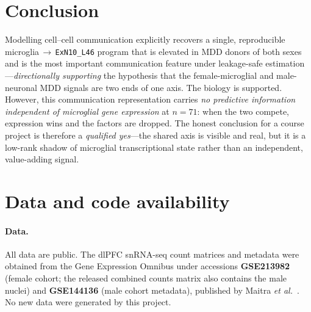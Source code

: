 \documentclass[11pt]{article}
\newcommand{\code}[1]{\texttt{\small #1}}
\begin{document}
\section{Conclusion}

Modelling cell--cell communication explicitly recovers a single, reproducible
microglia\,$\rightarrow$\,\code{ExN10\_L46} program that is elevated in MDD
donors of both sexes and is the most important communication feature under
leakage-safe estimation---\emph{directionally supporting} the hypothesis that the
female-microglial and male-neuronal MDD signals are two ends of one axis. The
biology is supported. However, this communication representation carries
\emph{no predictive information independent of microglial gene expression} at
$n=71$: when the two compete, expression wins and the factors are dropped. The
honest conclusion for a course project is therefore a \emph{qualified yes}---the
shared axis is visible and real, but it is a low-rank shadow of microglial
transcriptional state rather than an independent, value-adding signal.

\section*{Data and code availability}

\paragraph{Data.} All data are public. The dlPFC snRNA-seq count matrices and
metadata were obtained from the Gene Expression Omnibus under accessions
\textbf{GSE213982} (female cohort; the released combined counts matrix also
contains the male nuclei) and \textbf{GSE144136} (male cohort metadata),
published by Maitra \textit{et al.}~\cite{maitra2023}. No new data were
generated by this project.
\end{document}
